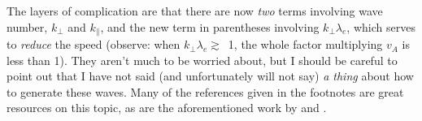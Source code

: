The layers of complication are that there are now \emph{two} terms involving
wave number, $k_\perp$ and $k_\parallel$, and the new term in parentheses
involving $k_\perp \lambda_e$, which serves to \emph{reduce} the \Alf speed
(observe: when $k_\perp \lambda_e \gtrsim$~1, the whole factor multiplying $v_A$
is less than 1). They aren't much to be worried about, but I should be careful
to point out that I have not said (and unfortunately will not say) \emph{a
  thing} about how to generate these waves. Many of the references given in the
footnotes are great resources on this topic, as are the aforementioned work by
\citet{Lysak1996} and \citet{Genot2004a}.




